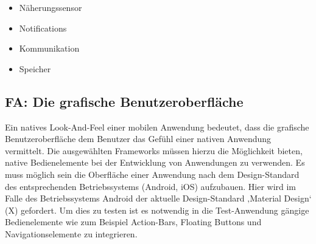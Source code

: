 \begin{itemize}
\item Näherungssensor

\item Notifications

\item Kommunikation

\item Speicher

\end{itemize}

\subsection{FA: Die grafische Benutzeroberfläche}

Ein natives Look-And-Feel einer mobilen Anwendung bedeutet, dass die grafische Benutzeroberfläche dem Benutzer das Gefühl einer nativen Anwendung vermittelt. Die ausgewählten Frameworks müssen hierzu die Möglichkeit bieten, native Bedienelemente bei der Entwicklung von Anwendungen zu verwenden. Es muss möglich sein die Oberfläche einer Anwendung nach dem Design-Standard des entsprechenden Betriebssystems (Android, iOS) aufzubauen. Hier wird im Falle des Betriebssystems Android der aktuelle Design-Standard ‚Material Design‘ (X) gefordert. Um dies zu testen ist es notwendig in die Test-Anwendung gängige Bedienelemente wie zum Beispiel Action-Bars, Floating Buttons und Navigationselemente zu integrieren.

